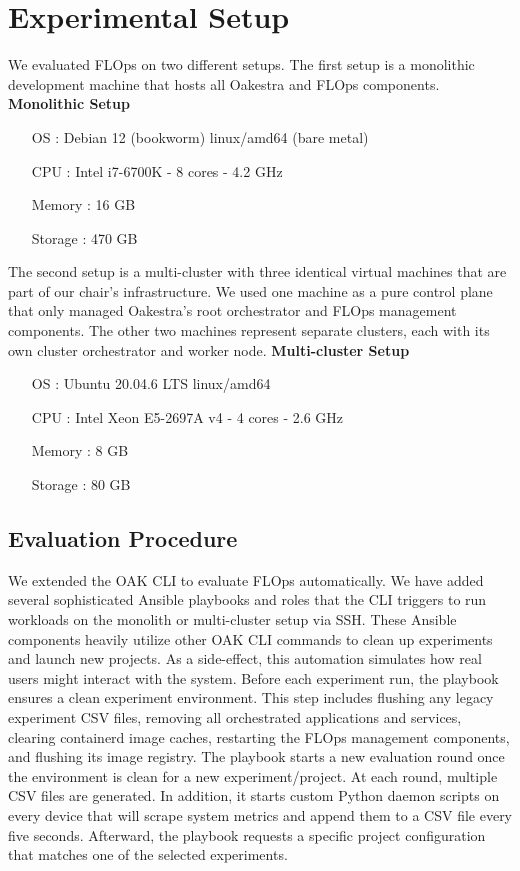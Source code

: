 \section{Experimental Setup}

We evaluated FLOps on two different setups.
The first setup is a monolithic development machine that hosts all Oakestra and FLOps components.
\vspace{5mm}
\newline
\textbf{Monolithic Setup}
\begin{itemize}
    \item [OS]: Debian 12 (bookworm) linux/amd64 (bare metal)
    \item [CPU]: Intel i7-6700K - 8 cores - 4.2 GHz
    \item [Memory]: 16 GB
    \item [Storage]: 470 GB
\end{itemize}

The second setup is a multi-cluster with three identical virtual machines that are part of our chair's infrastructure.
We used one machine as a pure control plane that only managed Oakestra's root orchestrator and FLOps management components.
The other two machines represent separate clusters, each with its own cluster orchestrator and worker node.
\vspace{5mm}
\newline
\textbf{Multi-cluster Setup}
\begin{itemize}
    \item [OS]: Ubuntu 20.04.6 LTS linux/amd64
    \item [CPU]: Intel Xeon E5-2697A v4 - 4 cores - 2.6 GHz 
    \item [Memory]: 8 GB
    \item [Storage]: 80 GB
\end{itemize}

\subsection{Evaluation Procedure}

We extended the OAK CLI to evaluate FLOps automatically.
We have added several sophisticated Ansible playbooks and roles that the CLI triggers to run workloads on the monolith or multi-cluster setup via SSH.
These Ansible components heavily utilize other OAK CLI commands to clean up experiments and launch new projects.
As a side-effect, this automation simulates how real users might interact with the system.
Before each experiment run, the playbook ensures a clean experiment environment.
This step includes flushing any legacy experiment CSV files, removing all orchestrated applications and services, clearing containerd image caches, restarting the FLOps management components, and flushing its image registry.
The playbook starts a new evaluation round once the environment is clean for a new experiment/project.
At each round, multiple CSV files are generated.
In addition, it starts custom Python daemon scripts on every device that will scrape system metrics and append them to a CSV file every five seconds.
Afterward, the playbook requests a specific project configuration that matches one of the selected experiments.

